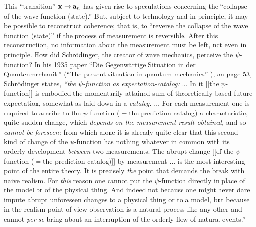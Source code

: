 {\begin{itemize}
This ``transition'' ${\bf x}\rightarrow {\bf a}_n$ has given rise to speculations
concerning the
``collapse
of the wave function (state).''  But, subject to technology and in principle,  it may be
possible to reconstruct coherence; that is, to ``reverse the collapse of
the wave function (state)'' if the process of measurement is
reversible. After this reconstruction, no information about the
measurement must be left, not even in principle.
How did Schr\"odinger, the creator of wave mechanics, perceive the
$\psi$-function? In his
1935 paper
``Die Gegenw\"artige
Situation in der Quantenmechanik'' (``The present situation in quantum
mechanics''
\cite{schrodinger}), on page 53, Schr\"odinger states,
{\em ``the $\psi$-function as expectation-catalog:}
$\ldots$
In it [[the $\psi$-function]] is embodied the momentarily-attained sum
of theoretically based future expectation, somewhat as laid down in a
{\em catalog.}
$\ldots$
For each measurement one is required to ascribe to the $\psi$-function
($=$the prediction catalog) a characteristic, quite sudden change,
which {\em depends on the measurement result obtained,} and so {\em
cannot be foreseen;} from which alone it is already quite clear
that this second kind of change of the $\psi$-function has nothing
whatever in common with its orderly development {\em between} two
measurements. The abrupt change [[of the $\psi$-function ($=$the
prediction catalog)]] by measurement $\ldots$ is the most interesting
point of the entire theory. It is precisely {\em the} point that demands
the break with naive realism. For {\em this} reason one cannot put the
$\psi$-function directly in place of the model or of the physical thing.
And indeed not because one might never dare impute abrupt unforeseen
changes to a physical thing or to a model, but because in the realism
point of view observation is a natural process like any other and cannot
{\em per se} bring about an interruption of the orderly flow of natural
events.''
\end{itemize}}
